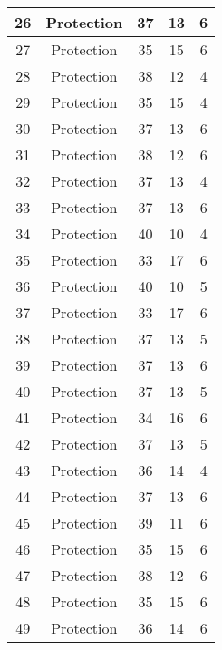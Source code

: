 \documentclass[results.tex]{subfiles}
\begin{document}
\begin{center}
\begin{tabular}{| c || c | c | c | c |}
    \hline
    26 & Protection & 37 & 13 & 6 \\ 
    \hline
    27 & Protection & 35 & 15 & 6 \\ 
    \hline
    28 & Protection & 38 & 12 & 4 \\ 
    \hline
    29 & Protection & 35 & 15 & 4 \\ 
    \hline
    30 & Protection & 37 & 13 & 6 \\ 
    \hline
    31 & Protection & 38 & 12 & 6 \\ 
    \hline
    32 & Protection & 37 & 13 & 4 \\ 
    \hline
    33 & Protection & 37 & 13 & 6 \\ 
    \hline
    34 & Protection & 40 & 10 & 4 \\ 
    \hline
    35 & Protection & 33 & 17 & 6 \\ 
    \hline
    36 & Protection & 40 & 10 & 5 \\ 
    \hline
    37 & Protection & 33 & 17 & 6 \\ 
    \hline
    38 & Protection & 37 & 13 & 5 \\ 
    \hline
    39 & Protection & 37 & 13 & 6 \\ 
    \hline
    40 & Protection & 37 & 13 & 5 \\ 
    \hline
    41 & Protection & 34 & 16 & 6 \\ 
    \hline
    42 & Protection & 37 & 13 & 5 \\ 
    \hline
    43 & Protection & 36 & 14 & 4 \\ 
    \hline
    44 & Protection & 37 & 13 & 6 \\ 
    \hline
    45 & Protection & 39 & 11 & 6 \\ 
    \hline
    46 & Protection & 35 & 15 & 6 \\ 
    \hline
    47 & Protection & 38 & 12 & 6 \\ 
    \hline
    48 & Protection & 35 & 15 & 6 \\ 
    \hline
    49 & Protection & 36 & 14 & 6 \\ 
    \hline   \end{tabular}
\end{center}
\end{document}
